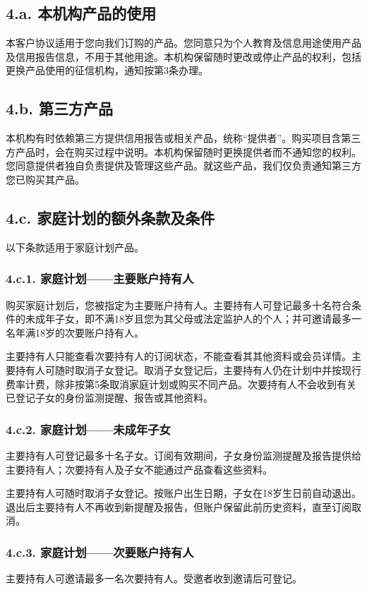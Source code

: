 \documentclass[UTF8,fontset=none,11pt,a4paper]{ctexart}
\begin{document}
\subsection*{4.a. 本机构产品的使用}
本客户协议适用于您向我们订购的产品。您同意只为个人教育及信息用途使用产品及信用报告信息，不用于其他用途。本机构保留随时更改或停止产品的权利，包括更换产品使用的征信机构，通知按第3条办理。


\subsection*{4.b. 第三方产品}
本机构有时依赖第三方提供信用报告或相关产品，统称“提供者”。购买项目含第三方产品时，会在购买过程中说明。本机构保留随时更换提供者而不通知您的权利。您同意提供者独自负责提供及管理这些产品。就这些产品，我们仅负责通知第三方您已购\allowbreak\mbox{买其产品。}


\subsection*{4.c. 家庭计划的额外条款及条件}
以下条款适用于家庭\allowbreak\mbox{计划产品。}


\subsubsection*{4.c.1. 家庭计划——主要账户持有人}
购买家庭计划后，您被指定为主要账户持有人。主要持有人可登记最多十名符合条件的未成年子女，即不满18岁且您为其父母或法定监护人的个人；并可邀请最多一名年满18岁的次要账\allowbreak\mbox{户持有人。}


主要持有人只能查看次要持有人的订阅状态，不能查看其其他资料或会员详情。主要持有人可随时取消子女登记。取消子女登记后，主要持有人仍在计划中并按现行费率计费，除非按第5条取消家庭计划或购买不同产品。次要持有人不会收到有关已登记子女的身份监测提醒、报告或\allowbreak\mbox{其他资料。}


\subsubsection*{4.c.2. 家庭计划——未成年子女}
主要持有人可登记最多十名子女。订阅有效期间，子女身份监测提醒及报告提供给主要持有人；次要持有人及子女不能通过产品查看\allowbreak\mbox{这些资料。}


主要持有人可随时取消子女登记。按账户出生日期，子女在18岁生日前自动退出。退出后主要持有人不再收到新提醒及报告，但账户保留此前历史资料，直至\allowbreak\mbox{订阅取消。}


\subsubsection*{4.c.3. 家庭计划——次要账户持有人}
主要持有人可邀请最多一名次要持有人。受邀者收到邀请\allowbreak\mbox{后可登记。}
\end{document}
